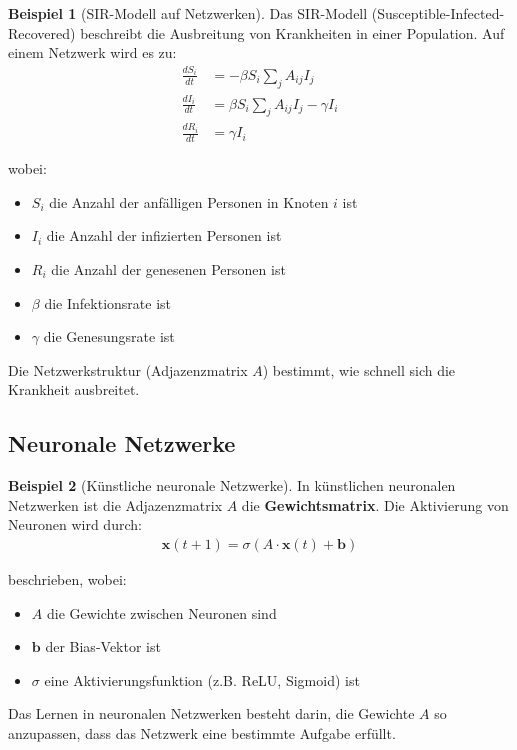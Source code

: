 ﻿\documentclass[a4paper,12pt]{report}
\theoremstyle{definition}
\newtheorem{beispiel}{Beispiel}
\begin{document}
	\begin{beispiel}[SIR-Modell auf Netzwerken]
		Das SIR-Modell (Susceptible-Infected-Re\-covered) beschreibt die Ausbreitung von Krankheiten in einer Population. Auf einem Netzwerk wird es zu:
		\begin{align}
			\frac{dS_i}{dt} &= -\beta S_i \sum_j A_{ij} I_j \\
			\frac{dI_i}{dt} &= \beta S_i \sum_j A_{ij} I_j - \gamma I_i \\
			\frac{dR_i}{dt} &= \gamma I_i
		\end{align}
		
		wobei:
		\begin{itemize}
			\item[-] $S_i$ die Anzahl der anfälligen Personen in Knoten $i$ ist
			\item[-] $I_i$ die Anzahl der infizierten Personen ist
			\item[-] $R_i$ die Anzahl der genesenen Personen ist
			\item[-] $\beta$ die Infektionsrate ist
			\item[-] $\gamma$ die Genesungsrate ist
		\end{itemize}
		
		Die Netzwerkstruktur (Adjazenzmatrix $A$) bestimmt, wie schnell sich die Krankheit ausbreitet.
	\end{beispiel}
	
	\subsection{Neuronale Netzwerke}
	
	\begin{beispiel}[Künstliche neuronale Netzwerke]
		In künstlichen neuronalen Netzwerken ist die Adjazenzmatrix $A$ die \textbf{Gewichtsmatrix}. Die Aktivierung von Neuronen wird durch:
		\begin{align}
			\mathbf{x}(t+1) = \sigma(A \cdot \mathbf{x}(t) + \mathbf{b})
		\end{align}
		
		beschrieben, wobei:
		\begin{itemize}
			\item[-] $A$ die Gewichte zwischen Neuronen sind
			\item[-] $\mathbf{b}$ der Bias-Vektor ist
			\item[-] $\sigma$ eine Aktivierungsfunktion (z.B. ReLU, Sigmoid) ist
		\end{itemize}
		
		Das Lernen in neuronalen Netzwerken besteht darin, die Gewichte $A$ so anzupassen, dass das Netzwerk eine bestimmte Aufgabe erfüllt.
	\end{beispiel}
	
\end{document}
